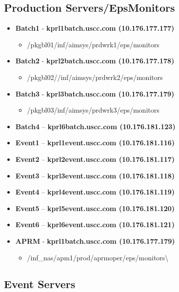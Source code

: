 \documentclass[12pt,twoside]{article}
\begin{document}
\subsection{Production Servers/EpsMonitors}
\label{sec-3-3}

\small
\begin{itemize}
\item \textbf{Batch1} - \textbf{kprl1batch.uscc.com (10.176.177.177)}
\begin{itemize}
\item \//pkgbl01\//inf\//aimsys\//prdwrk1\//eps\//monitors
\end{itemize}
\item \textbf{Batch2} - \textbf{kprl2batch.uscc.com (10.176.177.178)}
\begin{itemize}
\item \//pkgbl02\///inf\//aimsys\//prdwrk2\//eps\//monitors
\end{itemize}
\item \textbf{Batch3} - \textbf{kprl3batch.uscc.com (10.176.177.179)}
\begin{itemize}
\item \//pkgbl03\//inf\//aimsys\//prdwrk3\//eps\//monitors
\end{itemize}
\item \textbf{Batch4} – \textbf{kprl6batch.uscc.com (10.176.181.123)}
\item \textbf{Event1} – \textbf{kprl1event.uscc.com (10.176.181.116)}
\item \textbf{Event2} – \textbf{kprl2event.uscc.com (10.176.181.117)}
\item \textbf{Event3} – \textbf{kprl3event.uscc.com (10.176.181.118)}
\item \textbf{Event4} – \textbf{kprl4event.uscc.com (10.176.181.119)}
\item \textbf{Event5} – \textbf{kprl5event.uscc.com (10.176.181.120)}
\item \textbf{Event6} – \textbf{kprl6event.uscc.com (10.176.181.121)}
\item \textbf{APRM} - \textbf{kprl1batch.uscc.com (10.176.177.179)}
\begin{itemize}
\item \//inf\_nas\//apm1\//prod\//aprmoper\//eps\//monitors\textbackslash{}
\end{itemize}
\end{itemize}
\normalsize
\subsection{Event Servers}
\label{sec-3-4}
\end{document}
